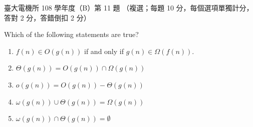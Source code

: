 \begin{pastexam}[label={px:ntu-108-ee-dsb-11}]{臺大電機所 108 學年度（B）第 11 題}
（複選；每題 10 分，每個選項單獨計分，答對 2 分，答錯倒扣 2 分）

Which of the following statements are true?
\begin{enumerate}[label=(\Alph*).]
\item $f(n)\in O(g(n))$ if and only if $g(n)\in\Omega(f(n))$.
\item $\Theta(g(n)) = O(g(n))\cap\Omega(g(n))$
\item $o(g(n)) = O(g(n)) - \Theta(g(n))$
\item $\omega(g(n))\cup\Theta(g(n)) = \Omega(g(n))$
\item $\omega(g(n))\cap\Theta(g(n)) = \emptyset$
\end{enumerate}
\end{pastexam}

